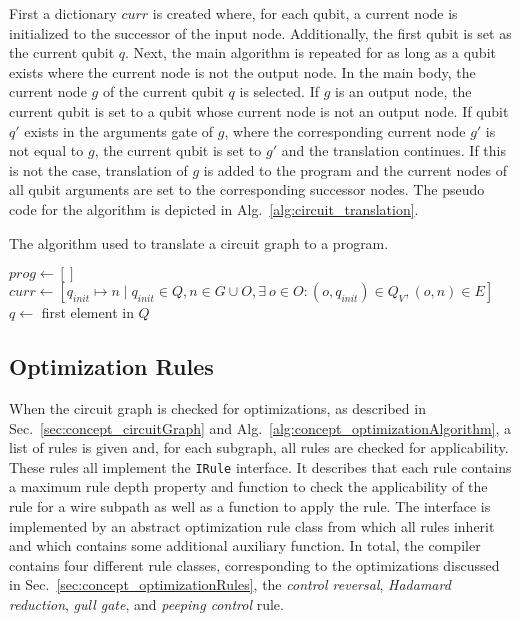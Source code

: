 First a dictionary $curr$ is created where, for each qubit, a current node is initialized to the successor of the input node. Additionally, the first qubit is set as the current qubit $q$. Next, the main algorithm is repeated for as long as a qubit exists where the current node is not the output node. In the main body, the current node $g$ of the current qubit $q$ is selected. If $g$ is an output node, the current qubit is set to a qubit whose current node is not an output node. If qubit $q'$ exists in the arguments gate of $g$, where the corresponding current node $g'$ is not equal to $g$, the current qubit is set to $g'$ and the translation continues. If this is not the case, translation of $g$ is added to the program and the current nodes of all qubit arguments are set to the corresponding successor nodes. The pseudo code for the algorithm is depicted in Alg.~\ref{alg:circuit_translation}.

\begin{algorithm}
    \caption{The algorithm used to translate a circuit graph to a program.}
    \label{alg:circuit_translation}
    $prog \gets []$\;
    $curr \gets [q_{init} \mapsto n \mid q_{init} \in Q, n \in G \cup O, \exists \ o \in O : (o, q_{init}) \in Q_V, (o, n) \in E]$\;
    $q \gets$ first element in $Q$\; 
\end{algorithm}

\subsection{Optimization Rules}
When the circuit graph is checked for optimizations, as described in Sec.~\ref{sec:concept_circuitGraph} and Alg.~\ref{alg:concept_optimizationAlgorithm}, a list of rules is given and, for each subgraph, all rules are checked for applicability. These rules all implement the \texttt{IRule} interface. It describes that each rule contains a maximum rule depth property and function to check the applicability of the rule for a wire subpath as well as a function to apply the rule. The interface is implemented by an abstract optimization rule class from which all rules inherit and which contains some additional auxiliary function. In total, the compiler contains four different rule classes, corresponding to the optimizations discussed in Sec.~\ref{sec:concept_optimizationRules}, the \emph{control reversal}, \emph{Hadamard reduction}, \emph{gull gate}, and \emph{peeping control} rule. 

